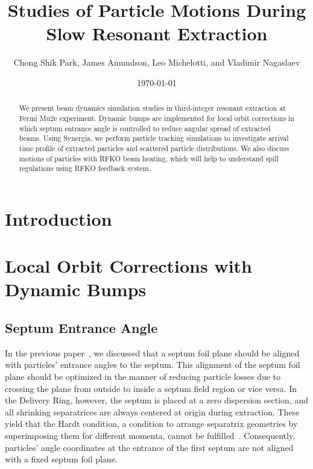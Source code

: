 \documentclass[aps,prstab,onecolumn,preprint,endfloats,11pt]{revtex4-1}
\begin{document}
\title{Studies of Particle Motions During Slow Resonant Extraction}
\author{Chong Shik Park, James Amundson, Leo Michelotti, and Vladimir Nagaslaev}
\date{\today}

\begin{abstract}
We present beam dynamics simulation studies in third-integer resonant extraction at Fermi Mu2e experiment. Dynamic bumps are implemented for local orbit corrections in which septum entrance angle is controlled to reduce angular spread of extracted beams. Using Synergia, we perform particle tracking simulations to investigate arrival time profile of extracted particles and scattered particle distributions. We also discuss motions of particles with RFKO beam heating, which will help to understand spill regulations using RFKO feedback system.
\end{abstract}

\pacs{}
\maketitle

\setcounter{tocdepth}{7}


\section{\label{sec:intro}Introduction}



\clearpage
\section{\label{sec:bump}Local Orbit Corrections with Dynamic Bumps}

\subsection{\label{sec:bump0}Septum Entrance Angle}

In the previous paper~\cite{mu2e}, we discussed that a septum foil plane should be aligned with particles' entrance angles to the septum.
This alignment of the septum foil plane should be optimized in the manner of reducing particle losses due to crossing the plane from outside to inside a septum field region or vice versa.
In the Delivery Ring, however, the septum is placed at a zero dispersion section, and all shrinking separatrices are always centered at origin during extraction.
These yield that the Hardt condition, a condition to arrange separatrix geometries by superimposing them for different momenta, cannot be fulfilled~\cite{pullia}.
Consequently, particles' angle coordinates at the entrance of the first septum are not aligned with a fixed septum foil plane.
\end{document}
